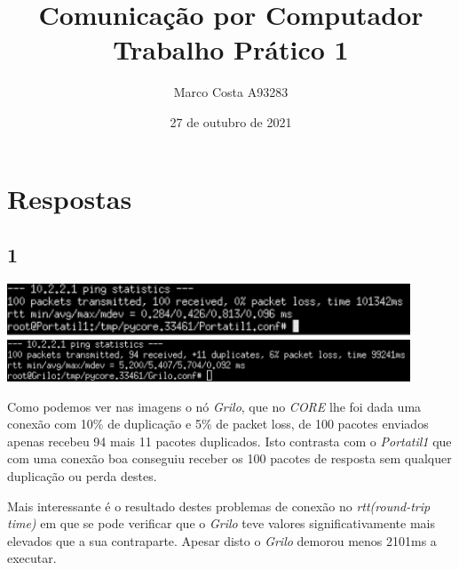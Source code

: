\documentclass{article}
\title{
    Comunicação por Computador \\
    \large{Trabalho Prático 1}
}
\author{
    Marco Costa A93283
}
\date{27 de outubro de 2021}
\affil{
    Universidade do Minho
}
\begin{document}
        \maketitle
    \section*{Respostas}
        \subsection*{1}
            {
                \centering
                \includegraphics[width=12cm]{images/ping-portatil.png}
                \includegraphics[width=12cm]{images/ping-grilo.png}
                \par
            }
                Como podemos ver nas imagens o nó \textit{Grilo}, que no \textit{CORE} lhe foi dada
            uma conexão com 10\% de duplicação e 5\% de packet loss, de 100 pacotes enviados apenas recebeu
            94 mais 11 pacotes duplicados. Isto contrasta com o \textit{Portatil1} que com uma conexão boa conseguiu
            receber os 100 pacotes de resposta sem qualquer duplicação ou perda destes.\par

                Mais interessante é o resultado destes problemas de conexão no \textit{rtt(round-trip time)} em que se pode verificar
            que o \textit{Grilo} teve valores significativamente mais elevados que a sua contraparte. Apesar disto o \textit{Grilo} demorou
            menos 2101ms a executar.
\end{document}
